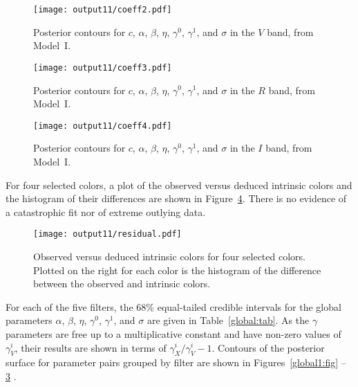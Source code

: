 \documentclass{aastex61}   	%
\begin{document}
\begin{figure}[htbp] %
   \centering
   \texttt{[image: output11/coeff2.pdf]} 
            \caption{Posterior contours for $c$, $\alpha$, $\beta$, $\eta$, $\gamma^0$, $\gamma^1$, and $\sigma$ in the $V$ band, from Model~I.
 \label{global3:fig}}
\end{figure}

\begin{figure}[htbp] %
   \centering
      \texttt{[image: output11/coeff3.pdf]} 
            \caption{Posterior contours for $c$, $\alpha$, $\beta$, $\eta$, $\gamma^0$, $\gamma^1$, and $\sigma$ in the $R$ band, from Model~I.
 \label{global4:fig}}
\end{figure}

\begin{figure}[htbp] %
   \centering
         \texttt{[image: output11/coeff4.pdf]} 
            \caption{Posterior contours for $c$, $\alpha$, $\beta$, $\eta$, $\gamma^0$, $\gamma^1$, and $\sigma$ in the $I$ band, from Model~I.
 \label{global5:fig}}
\end{figure}



\color{purple}
For four selected colors, a plot of the
observed versus deduced intrinsic colors and the histogram of their differences
\color{black}
are shown in Figure~\ref{residual:fig}. 
There is no evidence of a catastrophic fit nor of extreme
outlying data.

\begin{figure}[htbp] %
   \centering
   \texttt{[image: output11/residual.pdf]} 
            \caption{
            \color{purple}
            Observed versus deduced intrinsic colors for four selected colors.  Plotted on the right for each color
is the histogram of the difference between the observed and intrinsic colors.
\color{black}
            \label{residual:fig}}
\end{figure}


For each of the five filters, the 68\%  equal-tailed credible intervals for the global parameters $\alpha$, $\beta$, $\eta$, $\gamma^0$, $\gamma^1$, and $\sigma$
are given in Table~\ref{global:tab}.
As the $\gamma$ parameters are free up to a multiplicative constant and have non-zero values of $\gamma^i_V$,
their results are shown in terms of $\gamma^i_X/\gamma^i_V-1$.
Contours of the posterior surface for parameter pairs grouped by filter are shown in Figures~\ref{global1:fig} -- \ref{global5:fig} .
\end{document}
